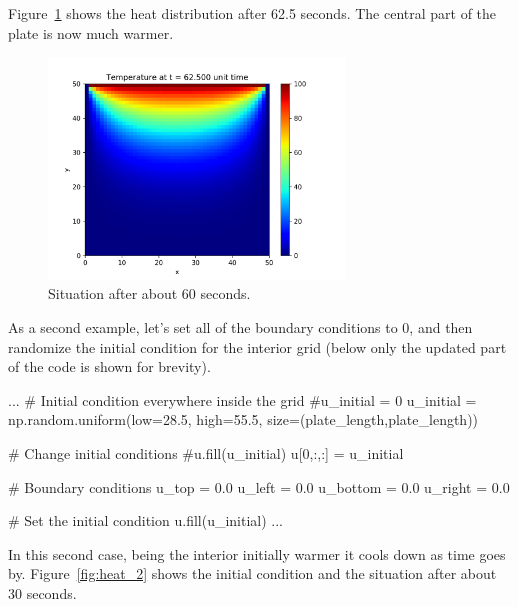 Figure~\ref{fig:heat_end_1} shows the heat distribution after 62.5 seconds. The central part of the plate is now much warmer. 
\begin{figure}[htb]
	\centering
	\includegraphics[width=0.7\textwidth]{figures/frame500}
	\caption{Situation after about 60 seconds.}
	\label{fig:heat_end_1}
\end{figure} 

As a second example, let’s set all of the boundary conditions to 0, and then randomize the initial condition for the interior grid (below only the updated part of the code is shown for brevity).

\begin{ipython}
...
# Initial condition everywhere inside the grid
#u_initial = 0
u_initial = np.random.uniform(low=28.5, high=55.5, size=(plate_length,plate_length))

# Change initial conditions
#u.fill(u_initial)
u[0,:,:] = u_initial

# Boundary conditions
u_top = 0.0
u_left = 0.0
u_bottom = 0.0
u_right = 0.0

# Set the initial condition
u.fill(u_initial)
...
\end{ipython}

In this second case, being the interior initially warmer it cools down as time goes by. Figure~\ref{fig:heat_2} shows the initial condition and the situation after about 30 seconds.
 
